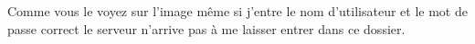 \documentclass{article}
\begin{document}
\begin{enumerate}
\begin{enumerate}
 \hspace*{-1.05in}
               \noindent{}
  
   \vspace{0.6cm}  
	\warning Comme vous le voyez sur l'image même si j'entre le nom d'utilisateur et le mot de passe correct le serveur n'arrive pas à me laisser entrer dans ce dossier.  
  \end{enumerate}
\end{enumerate}
\end{document}
